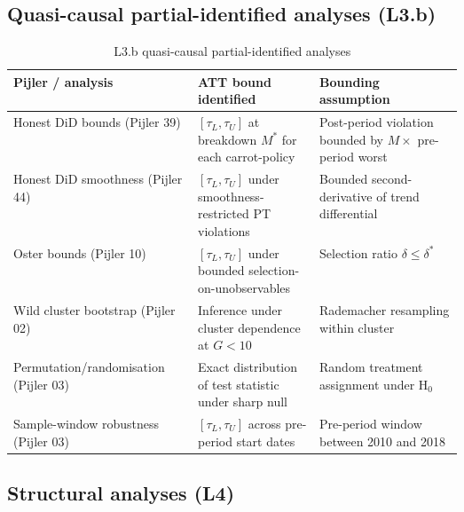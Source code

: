 \subsection*{Quasi-causal partial-identified analyses (L3.b)}

\begin{table}[!htbp]
\centering
\caption{L3.b quasi-causal partial-identified analyses}
\label{tab:app-id-L3b}
\small
\begin{tabular}{lp{0.27\linewidth}p{0.32\linewidth}}
\toprule
Pijler / analysis & ATT bound identified & Bounding assumption \\
\midrule
Honest DiD bounds (Pijler 39) & $[\tau_L, \tau_U]$ at breakdown $M^*$ for each carrot-policy & Post-period violation bounded by $M \times$ pre-period worst \\
Honest DiD smoothness (Pijler 44) & $[\tau_L, \tau_U]$ under smoothness-restricted PT violations & Bounded second-derivative of trend differential \\
Oster bounds (Pijler 10) & $[\tau_L, \tau_U]$ under bounded selection-on-unobservables & Selection ratio $\delta \leq \delta^*$ \\
Wild cluster bootstrap (Pijler 02) & Inference under cluster dependence at $G < 10$ & Rademacher resampling within cluster \\
Permutation/randomisation (Pijler 03) & Exact distribution of test statistic under sharp null & Random treatment assignment under H$_0$ \\
Sample-window robustness (Pijler 03) & $[\tau_L, \tau_U]$ across pre-period start dates & Pre-period window between 2010 and 2018 \\
\bottomrule
\end{tabular}
\end{table}

\subsection*{Structural analyses (L4)}

